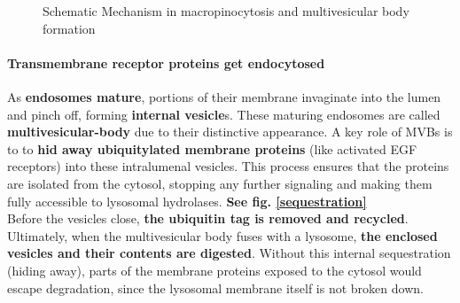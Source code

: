 \documentclass[../main.tex]{subfiles}
\begin{document}
\begin{figure}[H]
	\centering
	\caption{Schematic Mechanism in macropinocytosis and multivesicular body formation}
\end{figure}

\paragraph{Transmembrane receptor proteins get endocytosed}

As \textbf{endosomes mature}, portions of their membrane invaginate into the lumen and pinch off, forming \textbf{internal vesicle}s. These maturing endosomes are called \textbf{\gls{multivesicular-body}} due to their distinctive appearance. A key role of MVBs is to to \textbf{hid away ubiquitylated membrane proteins} (like activated EGF receptors) into these intralumenal vesicles. This process ensures that the proteins are isolated from the cytosol, stopping any further signaling and making them fully accessible to lysosomal hydrolases. \textbf{See fig. \ref{sequestration}} \\
\indent Before the vesicles close, \textbf{the ubiquitin tag is removed and recycled}. Ultimately, when the multivesicular body fuses with a lysosome, \textbf{the enclosed vesicles and their contents are digested}. Without this internal sequestration (hiding away), parts of the membrane proteins exposed to the cytosol would escape degradation, since the lysosomal membrane itself is not broken down.
\end{document}
